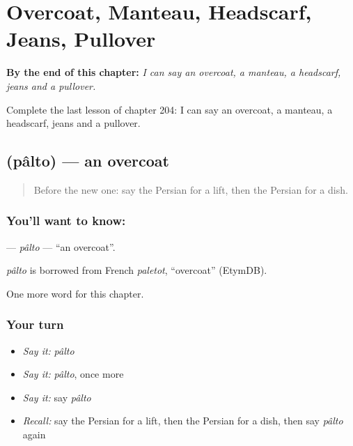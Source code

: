 
\chapter{Overcoat, Manteau, Headscarf, Jeans, Pullover}
\label{ch:fa-overcoat-manteau-headscarf-jeans-pullover}

\begin{chapteropening}
\textbf{By the end of this chapter:} \emph{I can say an overcoat, a manteau, a headscarf, jeans and a pullover.}

Complete the last lesson of chapter 204: I can say an overcoat, a manteau, a headscarf, jeans and a pullover.
\end{chapteropening}

\section[\texorpdfstring{\fa{پالتو} (pâlto)}{پالتو (pâlto)}]{ (pâlto) — an overcoat}

\label{lesson:FA-C204-palto}



\begin{quote}
Before the new one: say the Persian for a lift, then the Persian for a dish.
\end{quote}

\subsection*{You'll want to know: }
\textbf{} — \emph{pâlto} — \textquotedblleft{}an overcoat\textquotedblright{}.

\begin{cousinweb}
\emph{pâlto} is borrowed from French \emph{paletot}, \textquotedblleft{}overcoat\textquotedblright{} (EtymDB).
\end{cousinweb}

\begin{grammarlens}[title={What you've built}]
One more word for this chapter.
\end{grammarlens}

\subsection*{Your turn}
\begin{itemize}
\raggedright
  \item \emph{Say it:} \emph{pâlto}
  \item \emph{Say it:} \emph{pâlto}, once more
  \item \emph{Say it:} say \emph{pâlto}
  \item \emph{Recall:} say the Persian for a lift, then the Persian for a dish, then say \emph{pâlto} again
\end{itemize}

